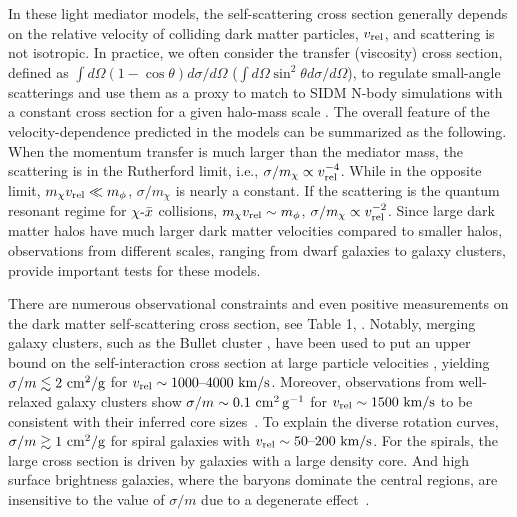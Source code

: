 In these light mediator models, the self-scattering cross section generally depends on the relative velocity of colliding dark matter particles, $v_{\rm rel}$, and scattering is not isotropic. In practice, we often consider the transfer (viscosity) cross section, defined as $\int d\Omega(1-\cos\theta)d\sigma/d\Omega$ ($\int d\Omega\sin^2\theta d\sigma/d\Omega$), to regulate small-angle scatterings and use them as a proxy to match to SIDM N-body simulations with a constant cross section for a given halo-mass scale \citep[see][]{Tulin:2013teo,Kahlhoefer:2013dca}. The overall feature of the velocity-dependence predicted in the models can be summarized as the following. When the momentum transfer is much larger than the mediator mass, the scattering is in the Rutherford limit, i.e., $\sigma/m_\chi\propto v^{-4}_{\rm rel}$. While in the opposite limit, $m_\chi v_{\rm rel}\ll m_\phi$, $\sigma/m_\chi$ is nearly a constant. If the scattering is the quantum resonant regime for $\chi\textup{-}\bar{x}$ collisions, $m_\chi v_{\rm rel}\sim m_\phi$, $\sigma/m_\chi\propto v^{-2}_{\rm rel}$. Since large dark matter halos have much larger dark matter velocities compared to smaller halos, observations from different scales, ranging from dwarf galaxies to galaxy clusters, provide important tests for these models.




There are numerous observational constraints and even positive measurements on the dark matter self-scattering cross section, see Table 1, \cite{Tulin:2017ara}. Notably, merging galaxy clusters, such as the Bullet cluster   \citep{Randall:2007ph,Robertson17BC}, have been used to put an upper bound on the self-interaction cross section at large particle velocities \citep[see,\eg][]{Kahlhoefer:2013dca,Kahlhoefer:2015vua,Kim:2016ujt,Harvey:2016bqd,Robertson:2016qef,Wittman:2017gxn}, yielding $\sigma/m\lesssim 2~{\rm cm^2/g}$ for $v_{\rm rel}\sim 1000\textup{--}4000~{\rm km/s}$. Moreover, observations from well-relaxed galaxy clusters \citep{Newman++11,Newman++13a,Newman++13b} show $\sigma/m\sim0.1\mathrm{\,\mathrm{\,cm}^2\mathrm{\,g}^{-1}}$ for $v_{\rm rel}\sim1500~{\rm km/s}$ to be consistent with their inferred core sizes~\citep{Kaplinghat:2015aga,Andrade:2019wzn}. To explain the diverse rotation curves, $\sigma/m\gtrsim1~{\rm cm^2/g}$ for spiral galaxies with $v_{\rm rel}\sim50\textup{--}200~{\rm km/s}$. For the spirals, the large cross section is driven by galaxies with a large density core. And high surface brightness galaxies, where the baryons dominate the central regions, are insensitive to the value of $\sigma/m$ due to a degenerate effect~\citep{Kamada:2016euw,Ren:2018jpt}. 

